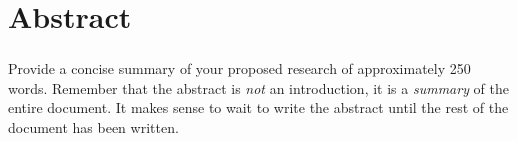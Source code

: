 \chapter*{Abstract} 
\subsection*{\thesistitle}

Provide a concise summary of your proposed research of approximately 250 words. 
Remember that the abstract is {\it not\/} an introduction, it is a {\it summary\/} of the entire document.
It makes sense to wait to write the abstract until the rest of the document has been written.